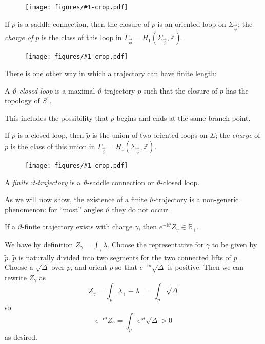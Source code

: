 \documentclass[12pt,letterpaper,reqno]{article}
\numberwithin{equation}{section}
\newcommand{\R}{\ensuremath{\mathbb R}}
\newcommand{\Z}{\ensuremath{\mathbb Z}}
\newcommand{\I}{{\mathrm i}}
\newcommand{\ti}[1]{\textit{#1}}
\newcommand{\insfig}[2]{\begin{figure}[htbp] \centering \texttt{[image: figures/\#1-crop.pdf]} \label{fig:#1} \end{figure}}
\begin{document}
\insfig{higgs-bundles-19}{0.8}

\begin{defn}
If $p$ is a saddle connection, then the closure of $\tilde p$
is an oriented loop on $\Sigma_{\vec \phi}$; the \ti{charge of $p$}
is the class of this loop in $\Gamma_{\vec\phi} = H_1(\Sigma_{\vec\phi},\Z)$.
\end{defn}

\insfig{higgs-bundles-20}{0.8}

There is one other way in which a trajectory can have finite length:

\begin{defn}
A \ti{$\vartheta$-closed loop} is a maximal $\vartheta$-trajectory $p$
such that the closure of $p$ has the topology of $S^1$.
\end{defn}
This includes the possibility that $p$ begins and ends
at the same branch point.

\begin{defn}
If $p$ is a closed loop, then $\tilde p$ is the union of two
oriented loops on $\Sigma$; the \ti{charge} of $\tilde p$
is the class of this union in $\Gamma_{\vec\phi} = H_1(\Sigma_{\vec\phi},\Z)$.
\end{defn}

\insfig{higgs-bundles-21}{0.8}

\begin{defn} A
\ti{finite $\vartheta$-trajectory} is a $\vartheta$-saddle connection or 
$\vartheta$-closed loop.
\end{defn}

As we will now show, the existence of a finite $\vartheta$-trajectory is a
non-generic phenomenon: for ``most'' angles $\vartheta$ they
do not occur.

\begin{lem}
If a $\vartheta$-finite trajectory exists with charge
$\gamma$, then $e^{- \I \vartheta} Z_\gamma \in \R_+$.
\end{lem}

\begin{pf} We have by definition $Z_\gamma = \int_\gamma \lambda$.
Choose the representative for $\gamma$ to be given by $\tilde p$.
$\tilde p$ is naturally divided into two segments for the two connected 
lifts of $p$. Choose a $\sqrt{\Delta}$ over $p$, and orient $p$
so that $e^{-\I \vartheta} \sqrt{\Delta}$ is positive.
Then we can rewrite $Z_\gamma$ as
\begin{equation}
Z_\gamma = \int_p \lambda_+ - \lambda_- = \int_p \sqrt{\Delta}	
\end{equation}
so
\begin{equation}
	e^{-\I \vartheta} Z_\gamma = \int_p e^{\I \vartheta} \sqrt{\Delta} > 0
\end{equation}
as desired.
\end{pf}
\end{document}
